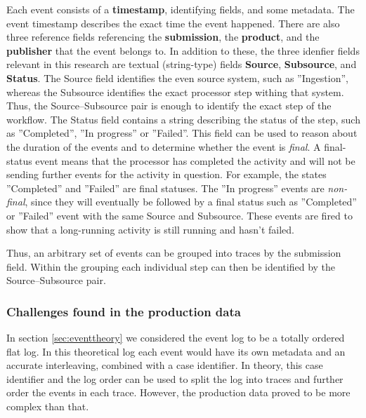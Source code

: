 Each event consists of a \textbf{timestamp}, identifying fields, and some metadata. 
The event timestamp describes the exact time the event happened. There are also three reference fields referencing the \textbf{submission}, the \textbf{product}, and the \textbf{publisher} that the event belongs to. 
In addition to these, the three idenfier fields relevant in this research are textual (string-type) fields \textbf{Source}, \textbf{Subsource}, and \textbf{Status}. 
The Source field identifies the even source system, such as ''Ingestion'', whereas the Subsource identifies the exact processor step withing that system. 
Thus, the Source--Subsource pair is enough to identify the exact step of the workflow. 
The Status field contains a string describing the status of the step, such as ''Completed'', ''In progress'' or ''Failed''. 
This field can be used to reason about the duration of the events and to determine whether the event is \emph{final}. 
A final-status event means that the processor has completed the activity and will not be sending further events for the activity in question.
For example, the states ''Completed'' and ''Failed'' are final statuses.
The ''In progress'' events are \emph{non-final}, since they will eventually be followed by a final status such as ''Completed'' or ''Failed'' event with the same Source and Subsource.
These events are fired to show that a long-running activity is still running and hasn't failed.



Thus, an arbitrary set of events can be grouped into traces by the submission field. Within the grouping each individual step can then be identified by the Source--Subsource pair.


\subsubsection{Challenges found in the production data}

In section \ref{sec:eventtheory} we considered the event log to be a totally ordered flat log. In this theoretical log each event would have its own metadata and an accurate interleaving, combined with a case identifier.
In theory, this case identifier and the log order can be used to split the log into traces and further order the events in each trace.
However, the production data proved to be more complex than that. 

